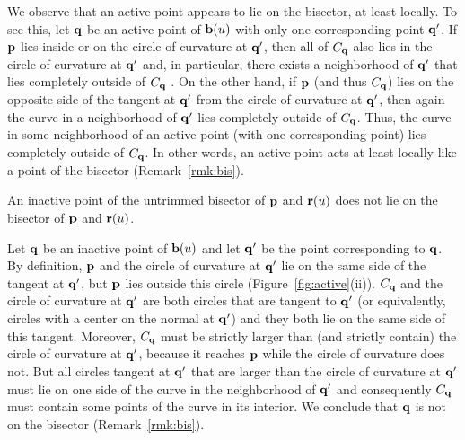 
\begin{rmk}
\label{r:active}
{\rm
We observe that an active point appears to lie on the bisector, at least
locally. To see this,
let ${\bf q}$ be an active point of ${\bf b}(u)$ with only one corresponding
point ${\bf q}'$.
If ${\bf p}$ lies inside or on the circle of curvature at ${\bf q}'$,
then all of $C_{\bf q}$ also lies in the circle of curvature at ${\bf q}'$
and, in particular, there exists a neighborhood of ${\bf q}'$
that lies completely outside of $C_{\bf q}$ \cite[p.~176]{H52}.
On the other hand, if ${\bf p}$ (and thus $C_{\bf q}$) lies on the opposite side
of the tangent at ${\bf q}'$ from the circle of curvature at ${\bf q}'$,
then again the curve in a neighborhood of ${\bf q}'$ lies completely outside of
$C_{\bf q}$.
Thus, the curve in some neighborhood of an active point (with one corresponding
point) lies completely outside of $C_{\bf q}$.
In other words, an active point acts at least locally
like a point of the bisector (Remark~\ref{rmk:bis}).
}
\end{rmk}

\begin{propn}
An inactive point of the untrimmed bisector of ${\bf p}$ and ${\bf r}(u)$
does not lie on the bisector of ${\bf p}$ and ${\bf r}(u)$.
\end{propn}
\prf
Let ${\bf q}$ be an inactive point of ${\bf b}(u)$
and let ${\bf q}'$ be the point corresponding to ${\bf q}$.
By definition, ${\bf p}$ and the circle of curvature at ${\bf q}'$ lie
on the same side of the tangent at ${\bf q}'$, but ${\bf p}$ lies outside this
circle (Figure~\ref{fig:active}(ii)).
$C_{\bf q}$ and the circle of curvature at ${\bf q}'$ are both circles that are
tangent to ${\bf q}'$ (or equivalently, circles with a center on the normal at ${\bf q}'$)
and they both lie on the same side of this tangent.
Moreover, $C_{\bf q}$ must be strictly larger than (and strictly contain)
the circle of curvature at ${\bf q}'$, because it reaches ${\bf p}$ while the circle
of curvature does not.
But all circles tangent at ${\bf q}'$ that are larger than the circle of curvature
at ${\bf q}'$ must lie on one side of the curve in the neighborhood of ${\bf q}'$
\cite[p.~176]{H52} and consequently $C_{\bf q}$ must contain some points of the curve
in its interior.
We conclude that ${\bf q}$ is not on the bisector (Remark~\ref{rmk:bis}).
\QED

